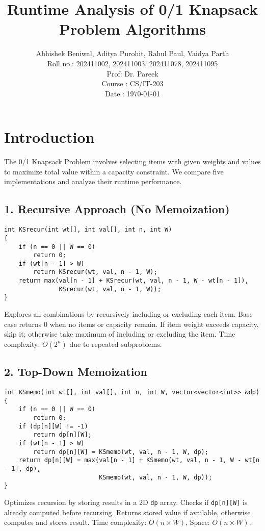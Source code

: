 \documentclass[12pt]{article}
\title{Runtime Analysis of 0/1 Knapsack Problem Algorithms}\\
\author{Abhishek Beniwal, Aditya Purohit, Rahul Paul, Vaidya Parth \\
\small{Roll no.: 202411002, 202411003, 202411078, 202411095} \\
\small{Prof: Dr. Pareek} \\
\small{Course : CS/IT-203} \\
\small{Date : \today}}\\
\date{}
\begin{document}
\maketitle


\newpage

\section{Introduction}
The 0/1 Knapsack Problem involves selecting items with given weights and values to maximize total value within a capacity constraint. We compare five implementations and analyze their runtime performance.

\subsection*{1. Recursive Approach (No Memoization)}

\begin{lstlisting}
int KSrecur(int wt[], int val[], int n, int W)
{
    if (n == 0 || W == 0)
        return 0;
    if (wt[n - 1] > W)
        return KSrecur(wt, val, n - 1, W);
    return max(val[n - 1] + KSrecur(wt, val, n - 1, W - wt[n - 1]), 
               KSrecur(wt, val, n - 1, W));
}
\end{lstlisting}

Explores all combinations by recursively including or excluding each item. Base case returns 0 when no items or capacity remain. If item weight exceeds capacity, skip it; otherwise take maximum of including or excluding the item. Time complexity: $O(2^n)$ due to repeated subproblems.

\newpage
\subsection*{2. Top-Down Memoization}

\begin{lstlisting}
int KSmemo(int wt[], int val[], int n, int W, vector<vector<int>> &dp)
{
    if (n == 0 || W == 0)
        return 0;
    if (dp[n][W] != -1)
        return dp[n][W];
    if (wt[n - 1] > W)
        return dp[n][W] = KSmemo(wt, val, n - 1, W, dp);
    return dp[n][W] = max(val[n - 1] + KSmemo(wt, val, n - 1, W - wt[n - 1], dp), 
                          KSmemo(wt, val, n - 1, W, dp));
}
\end{lstlisting}

Optimizes recursion by storing results in a 2D \texttt{dp} array. Checks if \texttt{dp[n][W]} is already computed before recursing. Returns stored value if available, otherwise computes and stores result. Time complexity: $O(n \times W)$, Space: $O(n \times W)$.
\end{document}
